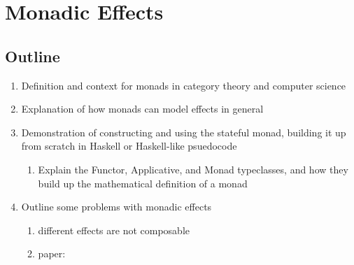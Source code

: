 \chapter{Monadic Effects}
\label{chapter:monadic-effects}

\section{Outline}
\begin{enumerate}
  \item Definition and context for monads in category theory and computer science
  \item Explanation of how monads can model effects in general
  \item Demonstration of constructing and using the stateful monad, building it up from scratch in Haskell or Haskell-like psuedocode
  \begin{enumerate}
    \item Explain the Functor, Applicative, and Monad typeclasses, and how they build up the mathematical definition of a monad
  \end{enumerate}
  \item Outline some problems with monadic effects
  \begin{enumerate}
    \item different effects are not composable
    \item paper: 
  \end{enumerate}
\end{enumerate}
